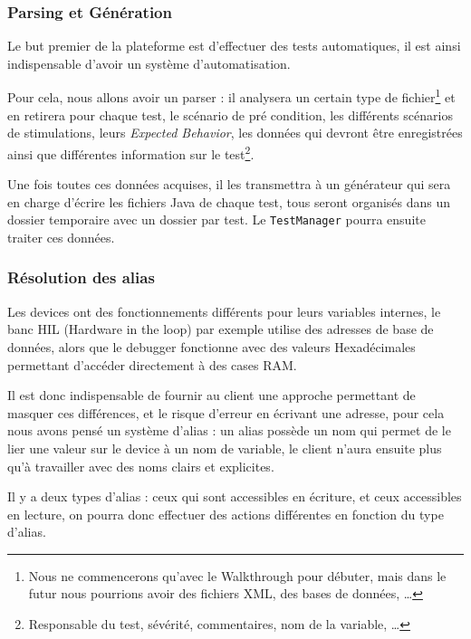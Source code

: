 	\subsubsection{Parsing et Génération}\label{generation}
	Le but premier de la plateforme est d'effectuer des tests automatiques, il est ainsi indispensable d'avoir un système d'automatisation.

	Pour cela, nous allons avoir un parser : il analysera un certain type de fichier\footnote{Nous ne commencerons qu'avec le Walkthrough pour débuter, mais dans le futur nous pourrions avoir des fichiers XML, des bases de données, \ldots} et en retirera pour chaque test, le scénario de pré condition, les différents scénarios de stimulations, leurs \textit{Expected Behavior}, les données qui devront être enregistrées ainsi que différentes information sur le test\footnote{Responsable du test, sévérité, commentaires, nom de la variable, \ldots}.

	Une fois toutes ces données acquises, il les transmettra à un générateur qui sera en charge d'écrire les fichiers Java de chaque test, tous seront organisés dans un dossier temporaire avec un dossier par test. Le \texttt{TestManager} pourra ensuite traiter ces données.

	\subsubsection{Résolution des alias}\label{alias}
		Les devices ont des fonctionnements différents pour leurs variables internes, le banc HIL (Hardware in the loop) par exemple utilise des adresses de base de données, alors que le debugger fonctionne avec des valeurs Hexadécimales permettant d'accéder directement à des cases RAM.

		Il est donc indispensable de fournir au client une approche permettant de masquer ces différences, et le risque d'erreur en écrivant une adresse, pour cela nous avons pensé un système d'alias : un alias possède un nom qui permet de le lier une valeur sur le device à un nom de variable, le client n'aura ensuite plus qu'à travailler avec des noms clairs et explicites.

		Il y a deux types d'alias : ceux qui sont accessibles en écriture, et ceux accessibles en lecture, on pourra donc effectuer des actions différentes en fonction du type d'alias.

